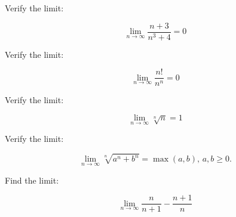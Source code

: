 \documentclass[12pt,letterpaper]{hmcpset}
\begin{document}

\begin{problem}[22.1.ii]
Verify the limit:

\[ \lim_{n \to \infty} \dfrac{n+3}{n^3+4} = 0\]

\end{problem}

\begin{solution}
\end{solution}

\begin{problem}[22.1.iv]
Verify the limit:

\[ \lim_{n \to \infty} \dfrac{n!}{n^n} = 0\]

\end{problem}

\begin{solution}

\end{solution}

\begin{problem}[22.1.vi]

Verify the limit:

\[ \lim_{n \to \infty} \sqrt[n]{n} = 1\]

\end{problem}

\begin{solution}

\end{solution}

\begin{problem}[22.1.viii]

Verify the limit:

\[ \lim_{n \to \infty} \sqrt[n]{a^n+b^n} = \max \left( a, b \right)\text{, }a,b \ge 0. \]

\end{problem}

\begin{solution}
\end{solution}

\begin{problem}[22.2.i]

Find the limit:

\[ \lim_{n \to \infty} \dfrac{n}{n+1} - \dfrac{n+1}{n} \]

\end{problem}
\end{document}
